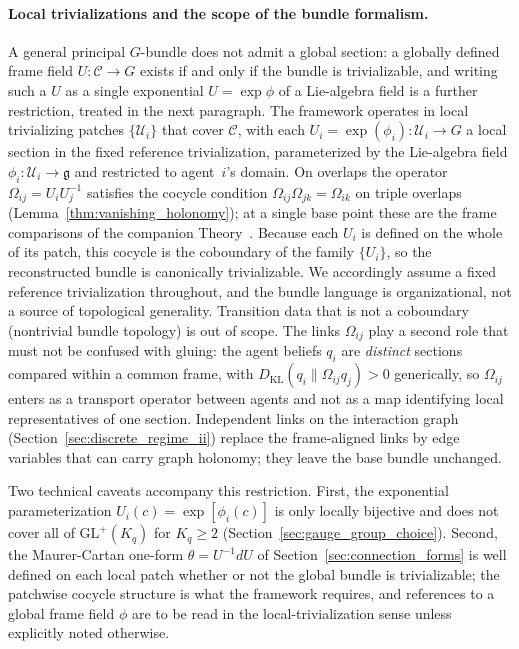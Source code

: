 \documentclass[11pt]{article}
\begin{document}
\paragraph{Local trivializations and the scope of the bundle formalism.}
\label{sec:local_trivialization}
A general principal $G$-bundle does not admit a global section: a globally defined frame field $U: \mathcal{C} \to G$ exists if and only if the bundle is trivializable, and writing such a $U$ as a single exponential $U = \exp\phi$ of a Lie-algebra field is a further restriction, treated in the next paragraph. The framework operates in local trivializing patches $\{\mathcal{U}_i\}$ that cover $\mathcal{C}$, with each $U_i = \exp(\phi_i): \mathcal{U}_i \to G$ a local section in the fixed reference trivialization, parameterized by the Lie-algebra field $\phi_i: \mathcal{U}_i \to \mathfrak{g}$ and restricted to agent~$i$'s domain. On overlaps the operator $\Omega_{ij} = U_iU_j^{-1}$ satisfies the cocycle condition $\Omega_{ij}\Omega_{jk} = \Omega_{ik}$ on triple overlaps (Lemma~\ref{thm:vanishing_holonomy}); at a single base point these are the frame comparisons of the companion Theory~\cite[Ch.~2]{DennisGaugeVFE2026}. Because each $U_i$ is defined on the whole of its patch, this cocycle is the coboundary of the family $\{U_i\}$, so the reconstructed bundle is canonically trivializable. We accordingly assume a fixed reference trivialization throughout, and the bundle language is organizational, not a source of topological generality. Transition data that is not a coboundary (nontrivial bundle topology) is out of scope. The links $\Omega_{ij}$ play a second role that must not be confused with gluing: the agent beliefs $q_i$ are \emph{distinct} sections compared within a common frame, with $D_{\mathrm{KL}}(q_i \| \Omega_{ij} q_j) > 0$ generically, so $\Omega_{ij}$ enters as a transport operator between agents and not as a map identifying local representatives of one section. Independent links on the interaction graph (Section~\ref{sec:discrete_regime_ii}) replace the frame-aligned links by edge variables that can carry graph holonomy; they leave the base bundle unchanged.

Two technical caveats accompany this restriction. First, the exponential parameterization $U_i(c)=\exp[\phi_i(c)]$ is only locally bijective and does not cover all of $\mathrm{GL}^+(K_q)$ for $K_q \geq 2$ (Section~\ref{sec:gauge_group_choice}). Second, the Maurer-Cartan one-form $\theta=U^{-1}dU$ of Section~\ref{sec:connection_forms} is well defined on each local patch whether or not the global bundle is trivializable; the patchwise cocycle structure is what the framework requires, and references to a global frame field $\phi$ are to be read in the local-trivialization sense unless explicitly noted otherwise.
\end{document}
